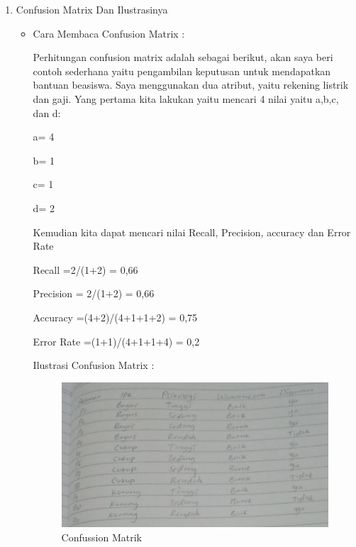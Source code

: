 \begin{enumerate}
\par
\item Confusion Matrix Dan Ilustrasinya
\begin{itemize}
\item Cara Membaca Confusion Matrix :
\par Perhitungan confusion matrix adalah sebagai berikut, akan saya beri contoh sederhana yaitu pengambilan keputusan untuk mendapatkan bantuan beasiswa. Saya menggunakan dua atribut, yaitu rekening listrik dan gaji. Yang pertama kita lakukan yaitu mencari 4 nilai yaitu a,b,c, dan d:
\par a= 4
\par b= 1
\par c= 1
\par d= 2
\par Kemudian kita dapat mencari nilai Recall, Precision, accuracy dan Error Rate
\par Recall =2/(1+2) = 0,66
\par Precision = 2/(1+2) = 0,66
\par Accuracy =(4+2)/(4+1+1+2) = 0,75
\par Error Rate =(1+1)/(4+1+1+4) = 0,2
\par Ilustrasi Confusion Matrix :
\par
\begin{figure}[ht]
\centering
\includegraphics[scale=1]{figures/AIP/asm3.PNG}
\caption{Confussion Matrik}
\label{contoh}
\end{figure}
\end{itemize}


\end{enumerate}
